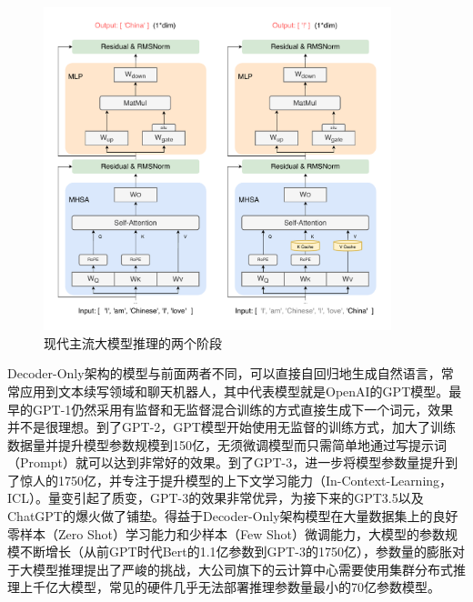 \begin{figure}[!htbp]
	\centering
    \includegraphics[width=0.9\textwidth]{figures/LLMInfer.pdf}
	\caption{现代主流大模型推理的两个阶段}
    \label{LLMInfer}
\end{figure}

Decoder-Only架构的模型与前面两者不同，可以直接自回归地生成自然语言，常常应用到文本续写领域和聊天机器人，其中代表模型就是OpenAI的GPT模型。最早的GPT-1\cite{GPT-1}仍然采用有监督和无监督混合训练的方式直接生成下一个词元，效果并不是很理想。到了GPT-2\cite{GPT-2}，GPT模型开始使用无监督的训练方式，加大了训练数据量并提升模型参数规模到150亿，无须微调模型而只需简单地通过写提示词（Prompt）就可以达到非常好的效果。到了GPT-3\cite{GPT-3}，进一步将模型参数量提升到了惊人的1750亿，并专注于提升模型的上下文学习能力（In-Context-Learning，ICL）。量变引起了质变，GPT-3的效果非常优异，为接下来的GPT3.5以及ChatGPT的爆火做了铺垫。得益于Decoder-Only架构模型在大量数据集上的良好零样本（Zero Shot）学习能力\cite{Zero-Shot}和少样本（Few Shot）微调能力\cite{Few-Shot}，大模型的参数规模不断增长（从前GPT时代Bert的1.1亿参数到GPT-3的1750亿），参数量的膨胀对于大模型推理提出了严峻的挑战，大公司旗下的云计算中心需要使用集群分布式推理上千亿大模型，常见的硬件几乎无法部署推理参数量最小的70亿参数模型。

